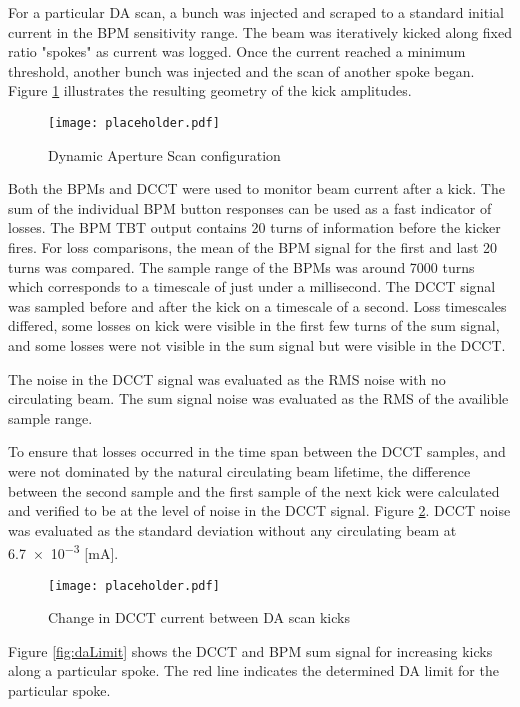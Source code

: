 For a particular DA scan, a bunch was injected and scraped to a standard initial current in the BPM sensitivity range. The beam was iteratively kicked along fixed ratio "spokes" as current was logged. Once the current reached a minimum threshold, another bunch was injected and the scan of another spoke began.  Figure \ref{fig:spokes} illustrates the resulting geometry of the kick amplitudes.

\begin{figure}
	\centering
	\texttt{[image: placeholder.pdf]}
	\caption{Dynamic Aperture Scan configuration}
	\label{fig:spokes}
\end{figure}

Both the BPMs and DCCT were used to monitor beam current after a kick. The sum of the individual BPM button responses can be used as a fast indicator of losses. The BPM TBT output contains 20 turns of information before the kicker fires. For loss comparisons, the mean of the BPM signal for the first and last 20 turns was compared. The sample range of the BPMs was around 7000 turns which corresponds to a timescale of just under a millisecond. The DCCT signal was sampled before and after the kick on a timescale of a second. Loss timescales differed, some losses on kick were visible in the first few turns of the sum signal, and some losses were not visible in the sum signal but were visible in the DCCT. 

The noise in the DCCT signal was evaluated as the RMS noise with no circulating beam. The sum signal noise was evaluated as the RMS of the availible sample range.

To ensure that losses occurred in the time span between the DCCT samples, and were not dominated by the natural circulating beam lifetime, the difference between the second sample and the first sample of the next kick were calculated and verified to be at the level of noise in the DCCT signal. Figure \ref{fig:dcctKickLife}. DCCT noise was evaluated as the standard deviation without any circulating beam at \num{6.7e-3} [mA].


\begin{figure}
	\centering
	\texttt{[image: placeholder.pdf]}
	\caption{Change in DCCT current between DA scan kicks}
	\label{fig:dcctKickLife}
\end{figure}

Figure \ref{fig:daLimit} shows the DCCT and BPM sum signal for increasing kicks along a particular spoke. The red line indicates the determined DA limit for the particular spoke.

